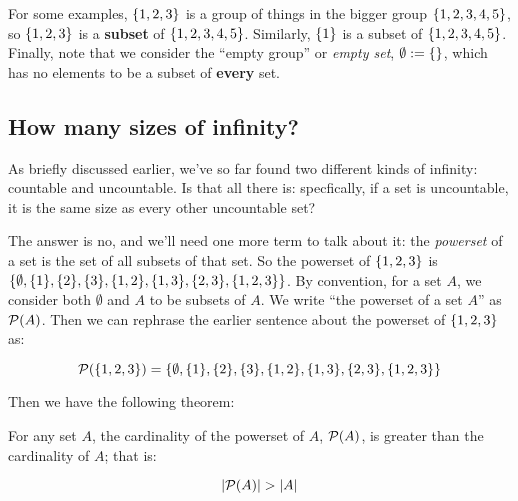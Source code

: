 For some examples, ${\left\{ {1,2,3} \right\}}$ is a group of things in the bigger group ${\left\{ {1,2,3,4,5} \right\}}$, so ${\left\{ {1,2,3} \right\}}$ is a \textbf{subset} of ${\left\{ {1,2,3,4,5} \right\}}$.
Similarly, ${\left\{ {1} \right\}}$ is a subset of ${\left\{ {1,2,3,4,5} \right\}}$.
Finally, note that we consider the ``empty group'' or \emph{empty set}, $\emptyset := {\left\{ {} \right\}}$, which has no elements to be a subset of \textbf{every} set.

\subsection{How many sizes of infinity?}

As briefly discussed earlier, we've so far found two different kinds of infinity: countable and uncountable.
Is that all there is: specfically, if a set is uncountable, it is the same size as every other uncountable set?

The answer is no, and we'll need one more term to talk about it: the \emph{powerset} of a set is the set of all subsets of that set.
So the powerset of ${\left\{ {1,2,3} \right\}}$ is ${\left\{ {\emptyset, {\left\{ {1} \right\}}, {\left\{ {2} \right\}}, {\left\{ {3} \right\}}, {\left\{ {1,2} \right\}}, {\left\{ {1,3} \right\}}, {\left\{ {2,3} \right\}}, {\left\{ {1,2,3} \right\}}} \right\}}$.
By convention, for a set $A$, we consider both $\emptyset$ and $A$ to be subsets of $A$.
We write ``the powerset of a set $A$'' as $\mathcal{P}{\left( {A} \right)}$.
Then we can rephrase the earlier sentence about the powerset of ${\left\{ {1,2,3} \right\}}$ as:

\[
    \mathcal{P}{\left( {{\left\{ {1,2,3} \right\}}} \right)} = {\left\{ {\emptyset, {\left\{ {1} \right\}}, {\left\{ {2} \right\}}, {\left\{ {3} \right\}}, {\left\{ {1,2} \right\}}, {\left\{ {1,3} \right\}}, {\left\{ {2,3} \right\}}, {\left\{ {1,2,3} \right\}}} \right\}}
\]

Then we have the following theorem:

\begin{theorem}
    For any set $A$, the cardinality of the powerset of $A$, $\mathcal{P}{\left( {A} \right)}$, is greater than the cardinality of $A$; that is:

    \[
        \left| \mathcal{P}{\left( {A} \right)} \right| > \left| A \right|
    \]
\end{theorem}

